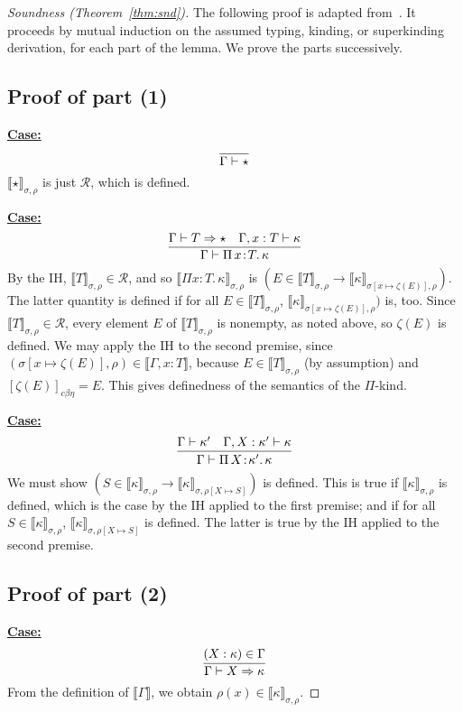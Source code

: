 \documentclass{article}
\newcommand{\choice}[0]{\zeta}
\newcommand{\abs}[4]{{#1}\, #2\! : \! #3.\, #4}
\newcommand{\interp}[1]{\llbracket #1 \rrbracket}
\newcommand{\tpsynth}[0]{\Rightarrow}
\newcommand{\cbe}[0]{c\beta\eta}
\newcommand{\startcase}[1]{\vspace{#1} \noindent\textbf{\underline{Case:}}}
\begin{document}
\begin{proof}[Soundness (Theorem~\ref{thm:snd})]
  The following proof is adapted from~\cite{stump17}.  It proceeds by
  mutual induction on the assumed typing, kinding, or superkinding
  derivation, for each part of the lemma.  We prove the parts
  successively.  

\subsection{Proof of part (1)}

\startcase{.2cm}
\[
\infer{\Gamma \vdash \star }{\ }
\]
$\interp{\star}_{\sigma,\rho}$ is just $\mathcal{R}$, which is
defined.  

\startcase{.2cm}
\[
    \infer{\Gamma\vdash\abs{\Pi}{x}{T}{\kappa}}{\Gamma \vdash T \tpsynth \star & \Gamma,x:T\vdash\kappa} 
\]
By the IH, $\interp{T}_{\sigma,\rho}\in\mathcal{R}$, and so
$\interp{\Pi x : T.\, \kappa}_{\sigma,\rho}$ is
$(E\in\interp{T}_{\sigma,\rho} \to \interp{\kappa}_{\sigma[x\mapsto  \choice(E)],\rho})$.
The latter quantity is defined if for all
$E\in\interp{T}_{\sigma,\rho}$, $\interp{\kappa}_{\sigma[x\mapsto \choice(E)],\rho})$ is, too.  Since
$\interp{T}_{\sigma,\rho}\in\mathcal{R}$, every element $E$ of
$\interp{T}_{\sigma,\rho}$ is nonempty, as noted above, 
so $\choice(E)$ is defined.  We may apply the IH to the second
premise, since
$(\sigma[x\mapsto\choice(E)],\rho)\in\interp{\Gamma,x:T}$, because $E\in\interp{T}_{\sigma,\rho}$ (by assumption)
and $[\choice(E)]_{\cbe} = E$.  This gives definedness of the semantics
of the $\Pi$-kind.

\startcase{.2cm}
\[
   \infer{\Gamma\vdash\abs{\Pi}{X}{\kappa'}{\kappa}}{\Gamma \vdash \kappa' & \Gamma,X:\kappa'\vdash\kappa}
\]
We must show $(S\in\interp{\kappa}_{\sigma,\rho} \to \interp{\kappa}_{\sigma,\rho[X\mapsto S]})$ is defined.
This is true if $\interp{\kappa}_{\sigma,\rho}$ is defined, which is the case by
the IH applied to the first premise; and if for all
$S\in\interp{\kappa}_{\sigma,\rho}$,
$\interp{\kappa}_{\sigma,\rho[X\mapsto S]}$ is defined.  The latter is
true by the IH applied to the second premise.  

\subsection{Proof of part (2)}

\startcase{.2cm}
\[
\infer{\Gamma \vdash X \tpsynth \kappa}{(X : \kappa) \in \Gamma} 
\]
From the definition of $\interp{\Gamma}$, we obtain
$\rho(x)\in\interp{\kappa}_{\sigma,\rho}$.


\end{proof}
\end{document}
